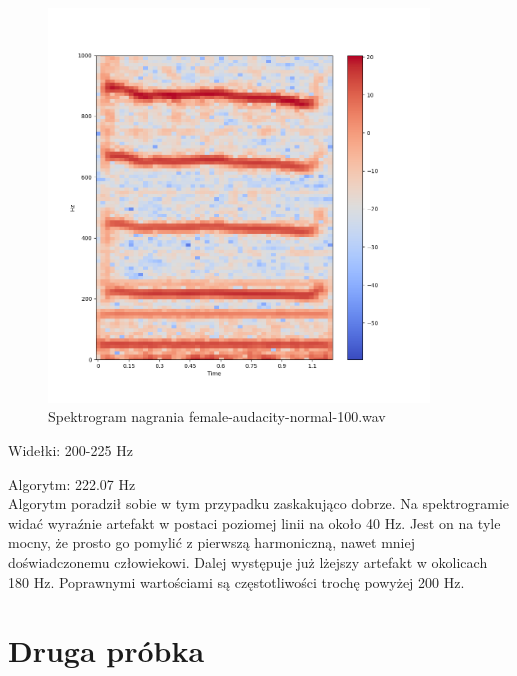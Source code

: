 \documentclass[a4paper,12pt]{extarticle}
\begin{document}
\begin{figure}[h!]
\centering
\includegraphics[width=0.9\textwidth]{female-audacity-normal-100}
\caption{Spektrogram nagrania female-audacity-normal-100.wav}
\end{figure}

\noindent Widełki: 200-225 Hz

\noindent Algorytm: 222.07 Hz\\

\noindent Algorytm poradził sobie w tym przypadku zaskakująco dobrze. Na spektrogramie widać wyraźnie artefakt w postaci poziomej linii na około 40 Hz. Jest on na tyle mocny, że prosto go pomylić z pierwszą harmoniczną, nawet mniej doświadczonemu człowiekowi. Dalej występuje już lżejszy artefakt w okolicach 180 Hz. Poprawnymi wartościami są częstotliwości trochę powyżej 200 Hz.

\clearpage

\section*{Druga próbka}
\end{document}
